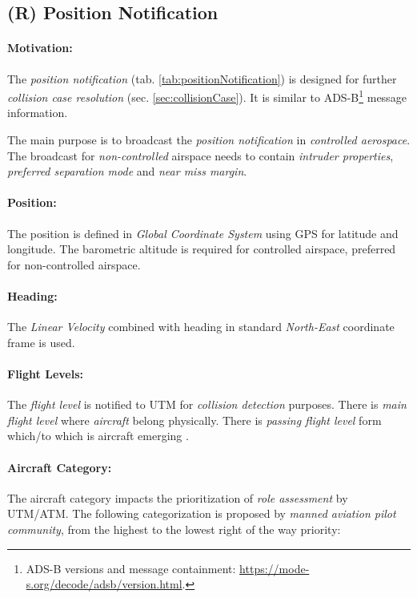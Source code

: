 \subsection{(R) Position Notification}\label{sec:positionNotification}

\paragraph{Motivation:} The \emph{position notification} (tab. \ref{tab:positionNotification}) is designed for further \emph{collision case resolution} (sec. \ref{sec:collisionCase}). It is similar to ADS-B\footnote{ADS-B versions and message containment: \url{https://mode-s.org/decode/adsb/version.html}.} message information. 


The main purpose is to broadcast the \emph{position notification} in \emph{controlled aerospace}. The broadcast for \emph{non-controlled} airspace needs to contain \emph{intruder properties}, \emph{preferred separation mode} and \emph{near miss margin}.

\paragraph{Position:} The position is defined in \emph{Global Coordinate System} using GPS for latitude and longitude. The barometric altitude is required for controlled airspace, preferred for non-controlled airspace.

\paragraph{Heading:} The \emph{Linear Velocity} combined with heading in standard \emph{North-East} coordinate frame is used.

\paragraph{Flight Levels:} The \emph{flight level} is notified to UTM for \emph{collision detection} purposes. There is \emph{main flight level} where \emph{aircraft} belong physically. There is \emph{passing flight level} form which/to which is aircraft emerging \cite{icao4444}. 

\paragraph{Aircraft Category:} The aircraft category impacts the prioritization of \emph{role assessment} by UTM/ATM. The following categorization is proposed by \emph{manned aviation pilot community}, from the highest to the lowest right of the way priority:

